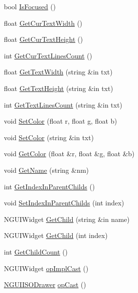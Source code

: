 \begin{DoxyCompactItemize}
bool \hyperlink{class_n_g_u_i_i_s_o_drawer_afa0f62ab41556ea14ecd9a40a809f237}{Is\+Focused} ()
\item 
float \hyperlink{class_n_g_u_i_i_s_o_drawer_a335a6cea9e6f9ff845bb6aa2450dba17}{Get\+Cur\+Text\+Width} ()
\item 
float \hyperlink{class_n_g_u_i_i_s_o_drawer_a960f5cc9dd0028df87a47b3ae975f6bf}{Get\+Cur\+Text\+Height} ()
\item 
int \hyperlink{class_n_g_u_i_i_s_o_drawer_a13a9c88b39e6fde486b50f210a0a6275}{Get\+Cur\+Text\+Lines\+Count} ()
\item 
float \hyperlink{class_n_g_u_i_i_s_o_drawer_afacb32925fa9d2d2ad4c8516f5becd04}{Get\+Text\+Width} (string \&in txt)
\item 
float \hyperlink{class_n_g_u_i_i_s_o_drawer_abb75cabe9bbaccb740d1c63b257e831b}{Get\+Text\+Height} (string \&in txt)
\item 
int \hyperlink{class_n_g_u_i_i_s_o_drawer_a14e2e72e57158ec1d6552177ba7cb7af}{Get\+Text\+Lines\+Count} (string \&in txt)
\item 
void \hyperlink{class_n_g_u_i_i_s_o_drawer_a8dd1326af9335158267ed3ddadc900d3}{Set\+Color} (float r, float g, float b)
\item 
void \hyperlink{class_n_g_u_i_i_s_o_drawer_a19962bf6f4a1971d93914152a202847f}{Set\+Color} (string \&in txt)
\item 
void \hyperlink{class_n_g_u_i_i_s_o_drawer_acc22efa45128f1badc7ad6b805137ca4}{Get\+Color} (float \&r, float \&g, float \&b)
\item 
void \hyperlink{class_n_g_u_i_i_s_o_drawer_a6ed5312dc652b39020c768776b3bd3fa}{Get\+Name} (string \&nm)
\item 
int \hyperlink{class_n_g_u_i_i_s_o_drawer_a6daf3194c80a33809510911d2d630c34}{Get\+Index\+In\+Parent\+Childs} ()
\item 
void \hyperlink{class_n_g_u_i_i_s_o_drawer_a74435de8e2cc76ce168a4616bd1b30d3}{Set\+Index\+In\+Parent\+Childs} (int index)
\item 
N\+G\+U\+I\+Widget \hyperlink{class_n_g_u_i_i_s_o_drawer_a6bfc832df79d99bf31b6a403a84f3572}{Get\+Child} (string \&in name)
\item 
N\+G\+U\+I\+Widget \hyperlink{class_n_g_u_i_i_s_o_drawer_a4bc5a82bf2cb380d267e3441ec8b54b6}{Get\+Child} (int index)
\item 
int \hyperlink{class_n_g_u_i_i_s_o_drawer_a3f559cdeee31ddaca418e3ce149fdff7}{Get\+Child\+Count} ()
\item 
N\+G\+U\+I\+Widget \hyperlink{class_n_g_u_i_i_s_o_drawer_a40793f32edd9c6f4a6e941471a4342f8}{op\+Impl\+Cast} ()
\item 
\hyperlink{class_n_g_u_i_i_s_o_drawer}{N\+G\+U\+I\+I\+S\+O\+Drawer} \hyperlink{class_n_g_u_i_i_s_o_drawer_a731e39cd9a4bbdd428bfdf0a31bc4505}{op\+Cast} ()
\end{DoxyCompactItemize}
